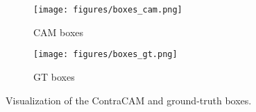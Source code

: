 \begin{figure}[h]
\centering\small
\begin{subfigure}{0.24\textwidth}
\texttt{[image: figures/boxes\_cam.png]}
\caption{CAM boxes}
\end{subfigure}
\begin{subfigure}{0.24\textwidth}
\texttt{[image: figures/boxes\_gt.png]}
\caption{GT boxes}
\end{subfigure}
\caption{
Visualization of the ContraCAM and ground-truth boxes.
}\label{fig:hard-box}
\end{figure}

